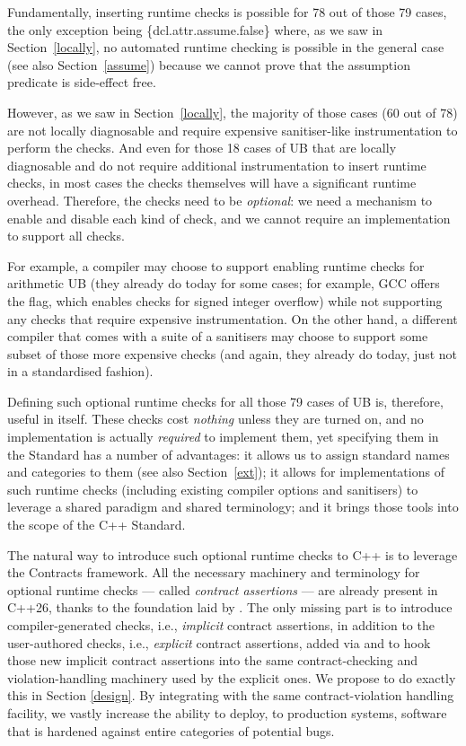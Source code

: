 {Fundamentally, inserting runtime checks is possible for 78 out of those 79 cases, the only exception being \{dcl.attr.assume.false\} where, as we saw in Section~\ref{locally}, no automated runtime checking is possible in the general case (see also Section~\ref{assume}) because we cannot prove that the assumption predicate is side-effect free.

However, as we saw in Section~\ref{locally}, the majority of those cases (60 out of 78) are not locally diagnosable and require expensive sanitiser-like instrumentation to perform the checks. And even for those 18 cases of UB that are locally diagnosable and do not require additional instrumentation to insert runtime checks, in most cases the checks themselves will have a significant runtime overhead. Therefore, the checks need to be \emph{optional}: we need a mechanism to enable and disable each kind of check, and we cannot require an implementation to support all checks.

For example, a compiler may choose to support enabling runtime checks for arithmetic UB (they already do today for some cases; for example, GCC offers the  flag, which enables checks for signed integer overflow) while not supporting any checks that require expensive instrumentation. On the other hand, a different compiler that comes with a suite of a sanitisers may choose to support some subset of those more expensive checks (and again, they already do today, just not in a standardised fashion).

Defining such optional runtime checks for all those 79 cases of UB is, therefore, useful in itself. These checks cost \emph{nothing} unless they are turned on, and no implementation is actually \emph{required} to implement them, yet specifying them in the Standard has a number of advantages: it allows us to assign standard names and categories to them (see also Section~\ref{ext}); it allows for implementations of such runtime checks (including existing compiler options and sanitisers) to leverage a shared paradigm and shared terminology; and it brings those tools into the scope of the C++ Standard.

The natural way to introduce such optional runtime checks to C++ is to leverage the Contracts framework. All the necessary machinery and terminology for optional runtime checks --- called \emph{contract assertions} --- are already present in C++26, thanks to the foundation laid by \cite{P2900R14}. The only missing part is to introduce compiler-generated checks, i.e., \emph{implicit} contract assertions, in addition to the user-authored checks, i.e., \emph{explicit} contract assertions,  added via \cite{P2900R14} and to hook those new implicit contract assertions into the same contract-checking and violation-handling machinery used by the explicit ones. We propose to do exactly this in Section \ref{design}. By integrating with the same contract-violation handling facility, we vastly increase the ability to deploy, to production systems, software that is hardened against entire categories of potential bugs.

}
